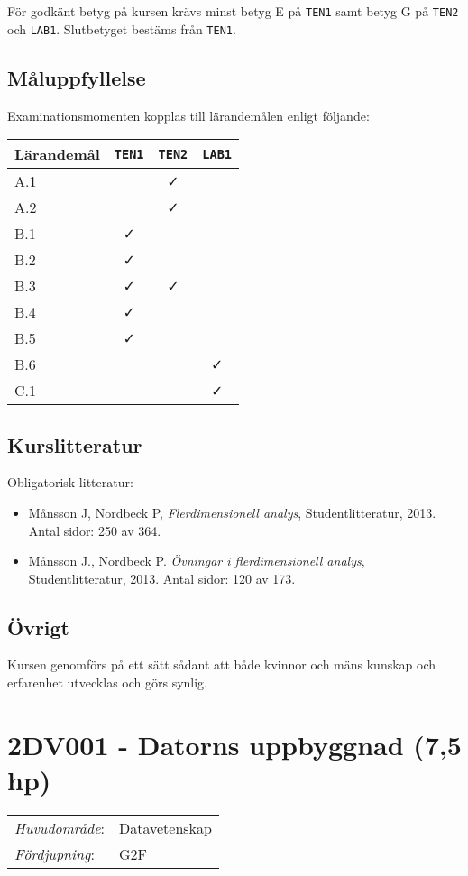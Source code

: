 För godkänt betyg på kursen krävs minst betyg E på \texttt{TEN1} samt betyg G på
\texttt{TEN2} och \texttt{LAB1}. Slutbetyget bestäms från \texttt{TEN1}.

\subsection*{Måluppfyllelse}

Examinationsmomenten kopplas till lärandemålen enligt följande:

\begin{longtable}[]{@{}lccc@{}}
\toprule
\textsf{Lärandemål} & \texttt{TEN1} & \texttt{TEN2} & \texttt{LAB1}\tabularnewline
\midrule
\endhead
A.1 & & \faCheck &\tabularnewline
A.2 & & \faCheck &\tabularnewline
B.1 & \faCheck & &\tabularnewline
B.2 & \faCheck & &\tabularnewline
B.3 & \faCheck & \faCheck &\tabularnewline
B.4 & \faCheck & &\tabularnewline
B.5 & \faCheck & &\tabularnewline
B.6 & & & \faCheck\tabularnewline
C.1 & & & \faCheck\tabularnewline
\bottomrule
\end{longtable}

\subsection*{Kurslitteratur}

Obligatorisk litteratur:

\begin{itemize}
\tightlist
\item
  Månsson J, Nordbeck P, \emph{Flerdimensionell analys},
  Studentlitteratur, 2013. Antal sidor: 250 av 364.
\item
  Månsson J., Nordbeck P. \emph{Övningar i flerdimensionell analys},
  Studentlitteratur, 2013. Antal sidor: 120 av 173.
\end{itemize}

\subsection*{Övrigt}

Kursen genomförs på ett sätt sådant att både kvinnor och mäns kunskap och erfarenhet utvecklas och görs synlig.
\pagebreak
\section*{2DV001 - Datorns uppbyggnad (7,5 hp)}

\begin{tabular}{ll}\emph{Huvudområde}: & Datavetenskap\tabularnewline\emph{Fördjupning}: & G2F\tabularnewline\end{tabular}


